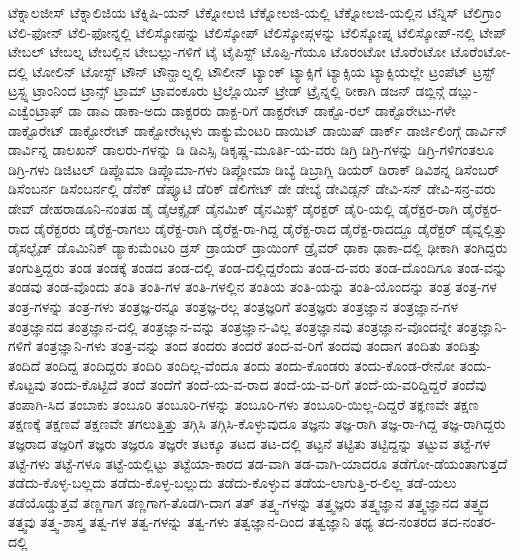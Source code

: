 {ಟೆಕ್ನಾಲಜೀಸ್
ಟೆಕ್ನಾಲಿಜಿಯ
ಟೆಕ್ನಿಷಿ-ಯನ್
ಟೆಕ್ನೋಲಜಿ
ಟೆಕ್ನೋಲಜಿ-ಯಲ್ಲಿ
ಟೆಕ್ನೋಲಜಿ-ಯಲ್ಲಿನ
ಟೆನ್ನಿಸ್
ಟೆಲಿಗ್ರಾಂ
ಟೆಲಿ-ಫೋನ್
ಟೆಲಿ-ಫೋನ್ನಲ್ಲಿ
ಟೆಲಿಸ್ಕೋಪನ್ನು
ಟೆಲಿಸ್ಕೋಪ್
ಟೆಲಿಸ್ಕೋಪ್ಗಳನ್ನು
ಟೆಲಿಸ್ಕೋಪ್ನ
ಟೆಲಿಸ್ಕೋಪ್-ನಲ್ಲಿ
ಟೇಪ್
ಟೇಬಲ್
ಟೇಬಲ್ನ
ಟೇಬಲ್ಲಿನ
ಟೇಬಲ್ಲು-ಗಳಿಗೆ
ಟೈ
ಟೈಪಿಸ್ಟ್
ಟೊಪ್ಪಿ-ಗೆಯೂ
ಟೊರಂಟೋ
ಟೊರೆಂಟೋ
ಟೊರೆಂಟೋ-ದಲ್ಲಿ
ಟೋಲಿನ್
ಟೋಸ್ಟ್
ಟೌನ್
ಟೌನ್ಹಾಲ್ನಲ್ಲಿ
ಟೌಲೀನ್
ಟ್ಯಾಂಕ್
ಟ್ಯಾಕ್ಸಿಗೆ
ಟ್ಯಾಕ್ಸಿಯ
ಟ್ಯಾಕ್ಸಿಯಲ್ಲೇ
ಟ್ರಂಪೆಟ್
ಟ್ರಸ್ಟ್
ಟ್ರಸ್ಟ್ನ
ಟ್ರಾಂನಿಂದ
ಟ್ರಾನ್ಸ್
ಟ್ರಾಮ್
ಟ್ರಾವಂಕೂರು
ಟ್ರಿಲ್ಲೊಯಿನ್
ಟ್ರೇಡ್
ಟ್ರೈನ್ನಲ್ಲಿ
ಠೀಕಾಗಿ
ಡಜನ್
ಡಬ್ಲಿನ್ಗೆ
ಡಬ್ಲು-ಎಚ್ವೆಂಟ್ರಾಫ್
ಡಾ
ಡಾಎ
ಡಾಕಾ-ಅದು
ಡಾಕ್ಟರರು
ಡಾಕ್ಟ-ರಿಗೆ
ಡಾಕ್ಟರೇಟ್
ಡಾಕ್ಟೊ-ರಲ್
ಡಾಕ್ಟೊರೇಟು-ಗಳೇ
ಡಾಕ್ಟೊರೇಟ್
ಡಾಕ್ಟೋರೇಟ್
ಡಾಕ್ಟೋರೇಟ್ಗಳು
ಡಾಕ್ಯುಮೆಂಟರಿ
ಡಾಯಿಟ್
ಡಾಯಿಷ್
ಡಾರ್ಕ್
ಡಾರ್ಜಿಲಿಂಗ್ಗೆ
ಡಾರ್ವಿನ್
ಡಾರ್ವಿನ್ನ
ಡಾಲಖನ್
ಡಾಲರು-ಗಳನ್ನು
ಡಿ
ಡಿಎಸ್ಸಿ
ಡಿಕೃಷ್ಣ-ಮೂರ್ತಿ-ಯ-ವರು
ಡಿಗ್ರಿ
ಡಿಗ್ರಿ-ಗಳನ್ನು
ಡಿಗ್ರಿ-ಗಳಿಗಂತಲೂ
ಡಿಗ್ರಿ-ಗಳು
ಡಿಜಿಟಲ್
ಡಿಪ್ಲೊಮಾ
ಡಿಪ್ಲೊಮಾ-ಗಳು
ಡಿಪ್ಲೋಮಾ
ಡಿಬ್ಯೆ
ಡಿಬ್ರಾಗ್ಲಿ
ಡಿಯರ್
ಡಿರಾಕ್
ಡಿವಿಶನ್ನ
ಡಿಸೆಂಬರ್
ಡಿಸೆಂಬರ್ನ
ಡಿಸೆಂಬರ್ನಲ್ಲಿ
ಡೆನೆಕ್
ಡೆಪ್ಯೂಟಿ
ಡೆರಿಕ್
ಡೆಲಿಗೇಟ್
ಡೇ
ಡೇಬ್ಯೆ
ಡೇವಿಡ್ಸನ್
ಡೇವಿ-ಸನ್
ಡೇವಿ-ಸನ್ರ-ವರು
ಡೇವ್
ಡೇಹರಾಡೂನಿ-ನಂತಹ
ಡೈ
ಡೈಆಕ್ಸೈಡ್
ಡೈನಮಿಕ್
ಡೈನಮಿಕ್ಸ್
ಡೈರಕ್ಟರ್
ಡೈರಿ-ಯಲ್ಲಿ
ಡೈರೆಕ್ಟರ-ರಾಗಿ
ಡೈರೆಕ್ಟರ-ರಾದ
ಡೈರೆಕ್ಟರರು
ಡೈರೆಕ್ಟ-ರಾಗಲು
ಡೈರೆಕ್ಟ-ರಾಗಿ
ಡೈರೆಕ್ಟ-ರಾ-ಗಿದ್ದ
ಡೈರೆಕ್ಟ-ರಾದ
ಡೈರೆಕ್ಟ-ರಾದದ್ದೂ
ಡೈರೆಕ್ಟರ್
ಡೈವ್ನಲ್ಲಿತ್ತು
ಡೈಸಲ್ಫೈಡ್
ಡೊಮಿನಿಕ್
ಡ್ಯಾಕುಮೆಂಟರಿ
ಡ್ರಸ್
ಡ್ರಾಯರ್
ಡ್ರಾಯಿಂಗ್
ಡ್ರೈವರ್
ಢಾಕಾ
ಢಾಕಾ-ದಲ್ಲಿ
ಢೀಕಾಗಿ
ತಂಗಿದ್ದರು
ತಂಗುತ್ತಿದ್ದರು
ತಂಡ
ತಂಡಕ್ಕೆ
ತಂಡದ
ತಂಡ-ದಲ್ಲಿ
ತಂಡ-ದಲ್ಲಿದ್ದರೆಂದು
ತಂಡ-ದ-ವರು
ತಂಡ-ದೊಂದಿಗೂ
ತಂಡ-ವನ್ನು
ತಂಡವು
ತಂಡ-ವೊಂದು
ತಂತಿ
ತಂತಿ-ಗಳ
ತಂತಿ-ಗಳಲ್ಲಿನ
ತಂತಿಯ
ತಂತಿ-ಯನ್ನು
ತಂತಿ-ಯೊಂದನ್ನು
ತಂತ್ರ
ತಂತ್ರ-ಗಳ
ತಂತ್ರ-ಗಳನ್ನು
ತಂತ್ರ-ಗಳು
ತಂತ್ರಜ್ಞ-ರನ್ನೂ
ತಂತ್ರಜ್ಞ-ರಲ್ಲ
ತಂತ್ರಜ್ಞರಿಗೆ
ತಂತ್ರಜ್ಞರು
ತಂತ್ರಜ್ಞಾನ
ತಂತ್ರಜ್ಞಾನ-ಗಳ
ತಂತ್ರಜ್ಞಾನದ
ತಂತ್ರಜ್ಞಾನ-ದಲ್ಲಿ
ತಂತ್ರಜ್ಞಾನ-ವನ್ನು
ತಂತ್ರಜ್ಞಾನ-ವಿಲ್ಲ
ತಂತ್ರಜ್ಞಾನವು
ತಂತ್ರಜ್ಞಾನ-ವೊಂದನ್ನೇ
ತಂತ್ರಜ್ಞಾನಿ-ಗಳಿಗೆ
ತಂತ್ರಜ್ಞಾನಿ-ಗಳು
ತಂತ್ರ-ವನ್ನು
ತಂದ
ತಂದರು
ತಂದರೆ
ತಂದ-ವ-ರಿಗೆ
ತಂದವು
ತಂದಾಗ
ತಂದಿತು
ತಂದಿತ್ತು
ತಂದಿದೆ
ತಂದಿದ್ದ
ತಂದಿದ್ದರು
ತಂದಿರಿ
ತಂದಿಲ್ಲ-ವೆಂದೂ
ತಂದು
ತಂದು-ಕೊಂಡರು
ತಂದು-ಕೊಂಡ-ರೇನೋ
ತಂದು-ಕೊಟ್ಟವು
ತಂದು-ಕೊಟ್ಟಿದೆ
ತಂದೆ
ತಂದೆಗೆ
ತಂದೆ-ಯ-ವ-ರಾದ
ತಂದೆ-ಯ-ವ-ರಿಗೆ
ತಂದೆ-ಯ-ವರಿದ್ದಿದ್ದರೆ
ತಂದೆವು
ತಂಪಾಗಿ-ಸಿದ
ತಂಬಾಕು
ತಂಬೂರಿ
ತಂಬೂರಿ-ಗಳನ್ನು
ತಂಬೂರಿ-ಗಳು
ತಂಬೂರಿ-ಯಿಲ್ಲ-ದಿದ್ದರೆ
ತಕ್ಞಣವೇ
ತಕ್ಷಣ
ತಕ್ಷಣಕ್ಕೆ
ತಕ್ಷಣವೆ
ತಕ್ಷಣವೇ
ತಗಲುತ್ತಿತ್ತು
ತಗ್ಗಿಸಿ
ತಗ್ಗಿಸಿ-ಕೊಳ್ಳುವುದೂ
ತಜ್ಞನು
ತಜ್ಞ-ರಾಗಿ
ತಜ್ಞ-ರಾ-ಗಿದ್ದ
ತಜ್ಞ-ರಾಗಿದ್ದರು
ತಜ್ಞರಾದ
ತಜ್ಞರಿಗೆ
ತಜ್ಞರು
ತಜ್ಞರೂ
ತಜ್ಞರೇ
ತಟಕ್ಕೂ
ತಟದ
ತಟ-ದಲ್ಲಿ
ತಟ್ಟನೆ
ತಟ್ಟಿತು
ತಟ್ಟಿದ್ದನ್ನು
ತಟ್ಟುವ
ತಟ್ಟೆ-ಗಳ
ತಟ್ಟೆ-ಗಳು
ತಟ್ಟೆ-ಗಳೂ
ತಟ್ಟೆ-ಯಲ್ಲಿಟ್ಟು
ತಟ್ಟೆಯಾ-ಕಾರದ
ತಡ-ವಾಗಿ
ತಡ-ವಾಗಿ-ಯಾದರೂ
ತಡೆಗೋ-ಡೆಯಂತಾಗುತ್ತದೆ
ತಡೆದು-ಕೊಳ್ಳ-ಬಲ್ಲದು
ತಡೆದು-ಕೊಳ್ಳ-ಬಲ್ಲುದು
ತಡೆದು-ಕೊಳ್ಳುವ
ತಡೆಯ-ಲಾಗುತ್ತಿ-ರ-ಲಿಲ್ಲ
ತಡೆ-ಯಲು
ತಡೆಯೊಡ್ಡುತ್ತವೆ
ತಣ್ಣಗಾಗ
ತಣ್ಣಗಾಗ-ತೊಡಗಿ-ದಾಗ
ತತ್
ತತ್ತ್ವ-ಗಳನ್ನು
ತತ್ತ್ವಜ್ಞರು
ತತ್ತ್ವಜ್ಞಾನ
ತತ್ತ್ವಜ್ಞಾನದ
ತತ್ತ್ವದ
ತತ್ತ್ವವು
ತತ್ತ್ವ-ಶಾಸ್ತ್ರ
ತತ್ವ-ಗಳ
ತತ್ವ-ಗಳನ್ನು
ತತ್ವ-ಗಳು
ತತ್ವಜ್ಞಾನ-ದಿಂದ
ತತ್ವಜ್ಞಾನಿ
ತಥ್ಯ
ತದ-ನಂತರದ
ತದ-ನಂತರ-ದಲ್ಲಿ
}
